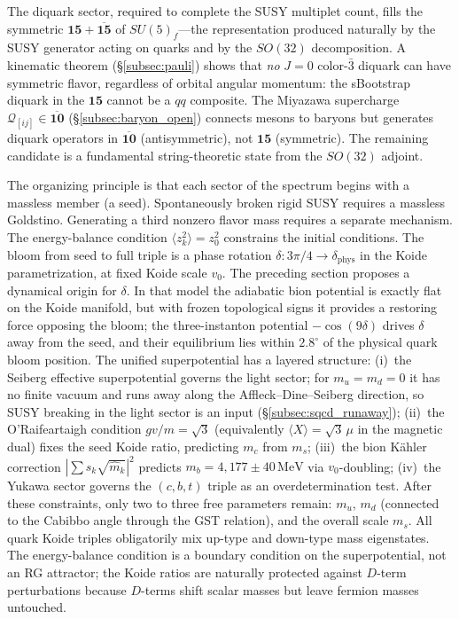 \documentclass[12pt,a4paper]{article}
\newcommand{\MeV}{\,\text{MeV}}
\begin{document}
The diquark sector, required to complete the SUSY multiplet count,
fills the symmetric $\mathbf{15} + \overline{\mathbf{15}}$ of
$SU(5)_f$---the representation produced naturally by the SUSY
generator acting on quarks and by the $SO(32)$ decomposition. A
kinematic theorem (\S\ref{subsec:pauli}) shows that \emph{no}
$J=0$ color-$\bar{3}$ diquark can have symmetric flavor, regardless
of orbital angular momentum: the sBootstrap diquark in the
$\mathbf{15}$ cannot be a $qq$ composite. The Miyazawa supercharge
$\mathcal{Q}_{[ij]} \in \overline{\mathbf{10}}$
(\S\ref{subsec:baryon_open}) connects mesons to baryons but
generates diquark operators in $\overline{\mathbf{10}}$
(antisymmetric), not $\mathbf{15}$ (symmetric).  The remaining
candidate is a fundamental string-theoretic state from the
$SO(32)$ adjoint.

The organizing principle is that each sector of the spectrum begins
with a massless member (a seed). Spontaneously broken rigid SUSY
requires a massless Goldstino. Generating a third nonzero flavor mass
requires a separate mechanism. The energy-balance condition
$\langle z_k^2\rangle = z_0^2$ constrains the initial conditions.
The bloom from seed to full triple is a phase rotation
$\delta: 3\pi/4 \to \delta_{\text{phys}}$ in the Koide
parametrization, at fixed Koide scale $v_0$.
The preceding section proposes a dynamical origin for $\delta$.
In that model the adiabatic bion potential is
exactly flat on the Koide manifold, but with frozen topological signs
it provides a restoring force opposing the bloom; the three-instanton
potential $-\cos(9\delta)$ drives $\delta$ away from the seed, and their
equilibrium lies within $2.8^\circ$ of the physical quark bloom position.
The unified superpotential has a layered structure:
(i)~the Seiberg effective superpotential governs the light sector;
for $m_u = m_d = 0$ it has no finite vacuum and runs away along the
Affleck--Dine--Seiberg direction, so SUSY breaking in the light sector
is an input (\S\ref{subsec:sqcd_runaway});
(ii)~the O'Raifeartaigh condition $gv/m = \sqrt{3}$ (equivalently
$\langle X\rangle = \sqrt{3}\,\mu$ in the magnetic dual) fixes the seed Koide ratio,
predicting $m_c$ from $m_s$;
(iii)~the bion K\"ahler correction
$|\!\sum s_k\sqrt{\hat m_k}|^2$ predicts
$m_b = 4{,}177 \pm 40\MeV$ via $v_0$-doubling;
(iv)~the Yukawa sector governs the $(c,b,t)$ triple as an
overdetermination test.
After these constraints, only two to three free parameters remain:
$m_u$, $m_d$ (connected to the Cabibbo angle through the GST
relation), and the overall scale $m_s$. All quark Koide triples
obligatorily mix up-type and down-type mass eigenstates.
The energy-balance condition is a boundary condition on the
superpotential, not an RG attractor; the Koide ratios are naturally
protected against $D$-term perturbations because $D$-terms shift
scalar masses but leave fermion masses untouched.
\end{document}
